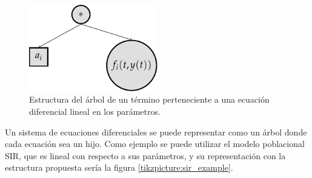 


\begin{figure}[h]
    \centering
    \includegraphics[width=0.5\textwidth]{"figures/doe_term_node_example.pdf"}
    \caption{Estructura del árbol de un término perteneciente a una ecuación diferencial lineal en los parámetros.}
    \label{tikzpicture:doe_term_node_example}
\end{figure}


Un sistema de ecuaciones diferenciales se puede representar como un árbol donde cada ecuación sea un hijo. Como ejemplo se puede utilizar el modelo poblacional SIR, que es lineal con respecto a sus parámetros, y su representación con la estructura propuesta sería la figura \ref{tikzpicture:sir_example}.



